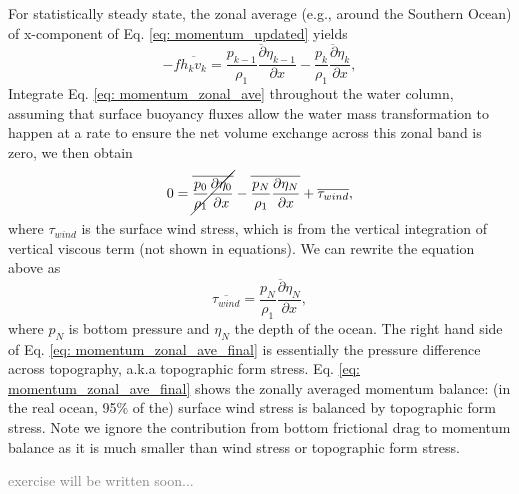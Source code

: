 For statistically steady state, the zonal average (e.g., around the Southern Ocean) of x-component of Eq. \eqref{eq: momentum_updated} yields 
\begin{equation}
    - f \overline{ h_{k}v_{k} } = \overline{ \frac{p_{k-1}}{\rho_{1}} \frac{ \partial \eta_{k-1} }{ \partial x } } - \overline{ \frac{p_{k}}{\rho_{1}} \frac{ \partial \eta_{k} }{ \partial x } },
    \label{eq: momentum_zonal_ave}
\end{equation}
Integrate Eq. \eqref{eq: momentum_zonal_ave} throughout the water column, assuming that surface buoyancy fluxes allow the water mass transformation to happen at a rate to ensure the net volume exchange across this zonal band is zero, we then obtain
\begin{equation}
    0 = \cancel{ \overline{ \frac{p_{0}}{\rho_{1}} \frac{ \partial \eta_{0} }{ \partial x } } }  - \overline {\frac{p_{N}}{\rho_{1}} \frac{ \partial \eta_{N} }{ \partial x }} + \overline{\tau_{wind}}, 
\end{equation}
where $\tau_{wind}$ is the surface wind stress, which is from the vertical integration of vertical viscous term (not shown in equations). We can rewrite the equation above as
\begin{equation}
    \overline{\tau_{wind}} = \overline{\frac{p_{N}}{\rho_{1}} \frac{ \partial \eta_{N} }{ \partial x }},
    \label{eq: momentum_zonal_ave_final}
\end{equation}
where $p_{N}$ is bottom pressure and $\eta_{N}$ the depth of the ocean. The right hand side of Eq. \eqref{eq: momentum_zonal_ave_final} is essentially the pressure difference across topography, a.k.a topographic form stress. Eq. \eqref{eq: momentum_zonal_ave_final} shows the zonally averaged momentum balance: (in the real ocean, 95\% of the) surface wind stress is balanced by topographic form stress. 
Note we ignore the contribution from bottom frictional drag to momentum balance as it is much smaller than wind stress or topographic form stress.

\textcolor{gray}{exercise will be written soon...}